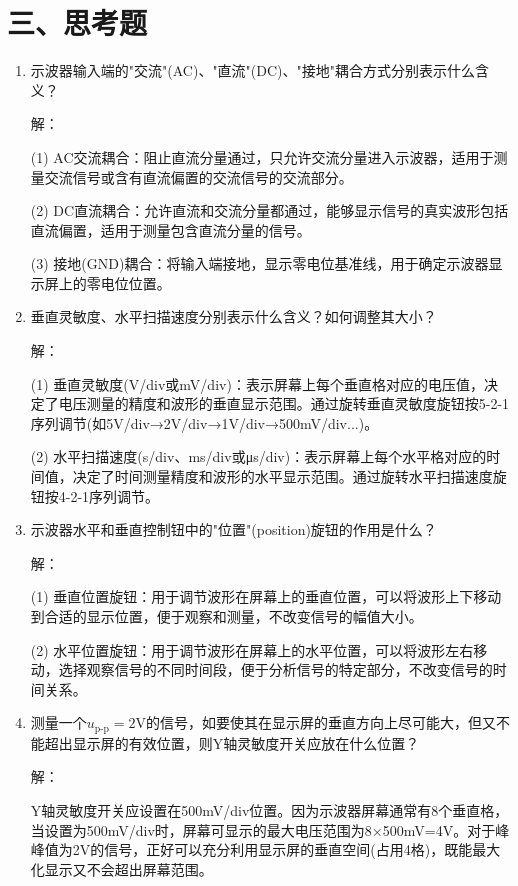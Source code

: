 \documentclass[12pt,a4paper]{article}
\begin{document}
\section*{三、思考题}
\begin{enumerate}
    \item 示波器输入端的"交流"(AC)、"直流"(DC)、"接地"耦合方式分别表示什么含义？
    
    解：

    (1) AC交流耦合：阻止直流分量通过，只允许交流分量进入示波器，适用于测量交流信号或含有直流偏置的交流信号的交流部分。

    (2) DC直流耦合：允许直流和交流分量都通过，能够显示信号的真实波形包括直流偏置，适用于测量包含直流分量的信号。

    (3) 接地(GND)耦合：将输入端接地，显示零电位基准线，用于确定示波器显示屏上的零电位位置。
    
    \item 垂直灵敏度、水平扫描速度分别表示什么含义？如何调整其大小？
    
    解：

    (1) 垂直灵敏度(V/div或mV/div)：表示屏幕上每个垂直格对应的电压值，决定了电压测量的精度和波形的垂直显示范围。通过旋转垂直灵敏度旋钮按5-2-1序列调节(如5V/div→2V/div→1V/div→500mV/div...)。

    (2) 水平扫描速度(s/div、ms/div或μs/div)：表示屏幕上每个水平格对应的时间值，决定了时间测量精度和波形的水平显示范围。通过旋转水平扫描速度旋钮按4-2-1序列调节。
    
    \item 示波器水平和垂直控制钮中的"位置"(position)旋钮的作用是什么？
    
    解：

    (1) 垂直位置旋钮：用于调节波形在屏幕上的垂直位置，可以将波形上下移动到合适的显示位置，便于观察和测量，不改变信号的幅值大小。

    (2) 水平位置旋钮：用于调节波形在屏幕上的水平位置，可以将波形左右移动，选择观察信号的不同时间段，便于分析信号的特定部分，不改变信号的时间关系。
    
    \item 测量一个$u_{\text{p-p}}=2\text{V}$的信号，如要使其在显示屏的垂直方向上尽可能大，但又不能超出显示屏的有效位置，则Y轴灵敏度开关应放在什么位置？
    
    解：
    
    Y轴灵敏度开关应设置在500mV/div位置。因为示波器屏幕通常有8个垂直格，当设置为500mV/div时，屏幕可显示的最大电压范围为8×500mV=4V。对于峰峰值为2V的信号，正好可以充分利用显示屏的垂直空间(占用4格)，既能最大化显示又不会超出屏幕范围。
    

\end{enumerate}
\end{document}
